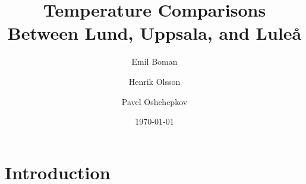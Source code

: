 \documentclass[aps,prl,groupedaddress,twocolumn]{revtex4-1}
\begin{document}

\title{Temperature Comparisons Between Lund, Uppsala, and Luleå}


\author{Emil Boman}
\author{Henrik Olsson}
\author{Pavel Oshchepkov}


\date{\today}

\begin{abstract}

\end{abstract}

\maketitle


\section{\label{intro}Introduction}


\end{document}
